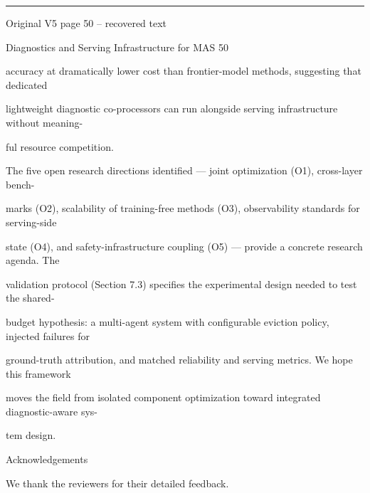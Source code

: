 \par\smallskip\noindent\rule{\textwidth}{0.4pt}\par{\sffamily\footnotesize Original V5 page 50 -- recovered text}\par\begin{flushleft}\footnotesize\ttfamily
\par\smallskip
\par\smallskip
\noindent Diagnostics and Serving Infrastructure for MAS 50\par
\par\smallskip
\par\smallskip
\par\smallskip
\noindent accuracy at dramatically lower cost than frontier-model methods, suggesting that dedicated\par
\noindent lightweight diagnostic co-processors can run alongside serving infrastructure without meaning-\par
\noindent ful resource competition.\par
\noindent  The five open research directions identified — joint optimization (O1), cross-layer bench-\par
\noindent marks (O2), scalability of training-free methods (O3), observability standards for serving-side\par
\noindent state (O4), and safety-infrastructure coupling (O5) — provide a concrete research agenda. The\par
\noindent validation protocol (Section 7.3) specifies the experimental design needed to test the shared-\par
\noindent budget hypothesis: a multi-agent system with configurable eviction policy, injected failures for\par
\noindent ground-truth attribution, and matched reliability and serving metrics. We hope this framework\par
\noindent moves the field from isolated component optimization toward integrated diagnostic-aware sys-\par
\noindent tem design.\par
\par\smallskip
\par\smallskip
\noindent Acknowledgements\par
\noindent We thank the reviewers for their detailed feedback.\par
\par\smallskip
\par\smallskip

\end{flushleft}
